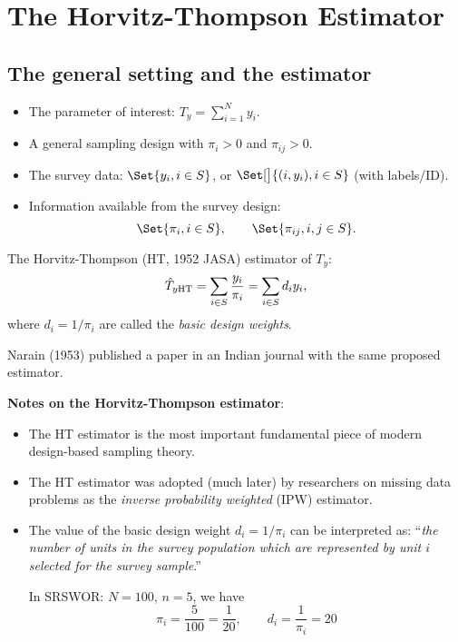 \section{The Horvitz-Thompson Estimator}
\subsection{The general setting and the estimator}
\begin{itemize}
      \item The parameter of interest: $ T_y=\sum_{i=1}^{N}y_i $.
      \item A general sampling design with $ \pi_i>0 $ and $ \pi_{ij}>0 $.
      \item The survey data: $ \Set{y_i,i\in S} $, or $ \Set[\big]{(i,y_i),i\in S} $ (with labels/ID).
      \item Information available from the survey design:
            \[ \Set{\pi_i,i\in S},\qquad \Set{\pi_{ij},i,j\in S}. \]
\end{itemize}
The Horvitz-Thompson (HT, 1952 JASA) estimator of $ T_y $:
\[ \hat{T}_{y\text{HT}}=\sum_{i\in S}\frac{y_i}{\pi_i}=\sum_{i\in S}d_i y_i, \]
where $ d_i=1/\pi_i $ are called the \emph{basic design weights}.

Narain (1953) published a paper in an Indian journal with the same
proposed estimator.

\textbf{Notes on the Horvitz-Thompson estimator}:
\begin{itemize}
      \item The HT estimator is the most important fundamental piece of
            modern design-based sampling theory.
      \item The HT estimator was adopted (much later) by researchers on
            missing data problems as the \emph{inverse probability weighted} (IPW)
            estimator.
      \item The value of the basic design weight $ d_i=1/\pi_i $ can be interpreted as:
            ``\emph{the number of units in the survey population which are
                  represented by unit $i$ selected for the survey sample}.''

            In SRSWOR\@: $ N=100 $, $ n=5 $, we have
            \[ \pi_i=\frac{5}{100}=\frac{1}{20},\qquad d_i=\frac{1}{\pi_i}=20 \]
\end{itemize}

